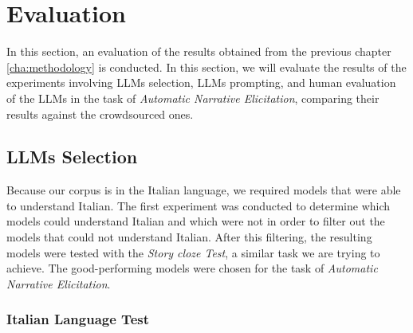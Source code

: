 \chapter{Evaluation}
\label{cha:evaluation}

In this section, an evaluation of the results obtained from the previous chapter \ref{cha:methodology} is conducted. In this section, we will evaluate the results of the experiments involving LLMs selection, LLMs prompting, and human evaluation of the LLMs in the task of \emph{Automatic Narrative Elicitation}, comparing their results against the crowdsourced ones.

\section{LLMs Selection}
\label{cha:evaluation-LLMs-selection}

Because our corpus is in the Italian language, we required models that were able to understand Italian. The first experiment was conducted to determine which models could understand Italian and which were not in order to filter out the models that could not understand Italian. After this filtering, the resulting models were tested with the \emph{Story cloze Test}, a similar task we are trying to achieve. The good-performing models were chosen for the task of \emph{Automatic Narrative Elicitation}.

\subsection{Italian Language Test}

